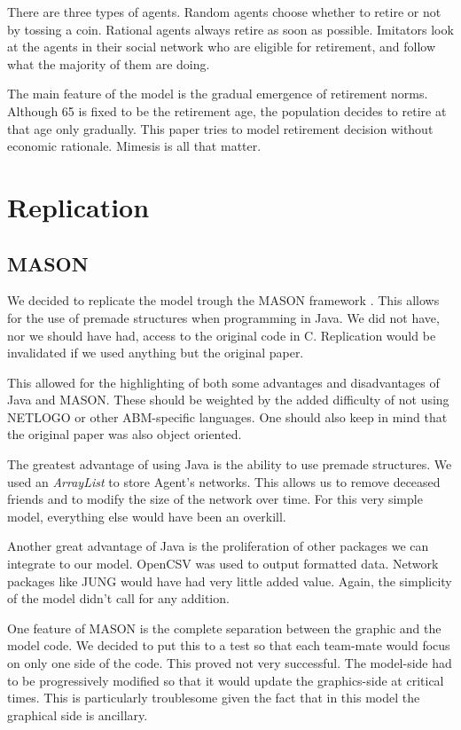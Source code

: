 \documentclass[runningheads,a4paper]{article}
\begin{document}
There are three types of agents.
Random agents choose whether to retire or not by tossing a coin.
Rational agents always retire as soon as possible.
Imitators look at the agents in their social network who are eligible for retirement, and follow what the majority of them are doing.

The main feature of the model is the gradual emergence of retirement norms.
Although 65 is fixed to be the retirement age, the population decides to retire at that age only gradually.
This paper tries to model retirement decision without economic rationale.
Mimesis is all that matter.

\section{Replication}

\subsection{MASON}
We decided to replicate the model trough the MASON framework \cite{luke2005mason}.
This allows for the use of premade structures when programming in Java.
We did not have, nor we should have had, access to the original code in C.
Replication would be invalidated if we used anything but the original paper.

This allowed for the highlighting of both some advantages and disadvantages of Java and MASON.
These should be weighted by the added difficulty of not using NETLOGO or other ABM-specific languages.
One should also keep in mind that the original paper was also object oriented.

The greatest advantage of using Java is the ability to use premade structures.
We used an \textit{ArrayList} to store Agent's networks.
This allows us to remove deceased friends and to modify the size of the network over time.
For this very simple model, everything else would have been an overkill.

Another great advantage of Java is the proliferation of other packages we can integrate to our model.
OpenCSV was used to output formatted data.
Network packages like JUNG would have had very little added value.
Again, the simplicity of the model didn't call for any addition.

One feature of MASON is the complete separation between the graphic and the model code.
We decided to put this to a test so that each team-mate would focus on only one side of the code.
This proved not very successful.
The model-side had to be progressively modified so that it would update the graphics-side at critical times.
This is particularly troublesome given the fact that in this model the graphical side is ancillary.
\end{document}
